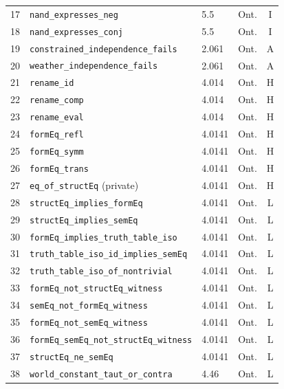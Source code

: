 \documentclass[10pt, letterpaper]{article}
\theoremstyle{definition}
\theoremstyle{remark}
\begin{document}
\begin{table}[p]
\begin{tabular}{@{}rlllc@{}}
17 & \texttt{nand\_expresses\_neg}                       & 5.5     & Ont. & I \\
18 & \texttt{nand\_expresses\_conj}                      & 5.5     & Ont. & I \\
19 & \texttt{constrained\_independence\_fails}           & 2.061   & Ont. & A \\
20 & \texttt{weather\_independence\_fails}               & 2.061   & Ont. & A \\
21 & \texttt{rename\_id}                                 & 4.014   & Ont. & H \\
22 & \texttt{rename\_comp}                               & 4.014   & Ont. & H \\
23 & \texttt{rename\_eval}                               & 4.014   & Ont. & H \\
24 & \texttt{formEq\_refl}                               & 4.0141  & Ont. & H \\
25 & \texttt{formEq\_symm}                               & 4.0141  & Ont. & H \\
26 & \texttt{formEq\_trans}                              & 4.0141  & Ont. & H \\
27 & \texttt{eq\_of\_structEq} (private)                 & 4.0141  & Ont. & H \\
28 & \texttt{structEq\_implies\_formEq}                  & 4.0141  & Ont. & L \\
29 & \texttt{structEq\_implies\_semEq}                   & 4.0141  & Ont. & L \\
30 & \texttt{formEq\_implies\_truth\_table\_iso}         & 4.0141  & Ont. & L \\
31 & \texttt{truth\_table\_iso\_id\_implies\_semEq}      & 4.0141  & Ont. & L \\
32 & \texttt{truth\_table\_iso\_of\_nontrivial}          & 4.0141  & Ont. & L \\
33 & \texttt{formEq\_not\_structEq\_witness}             & 4.0141  & Ont. & L \\
34 & \texttt{semEq\_not\_formEq\_witness}                & 4.0141  & Ont. & L \\
35 & \texttt{formEq\_not\_semEq\_witness}                & 4.0141  & Ont. & L \\
36 & \texttt{formEq\_semEq\_not\_structEq\_witness}      & 4.0141  & Ont. & L \\
37 & \texttt{structEq\_ne\_semEq}                        & 4.0141  & Ont. & L \\
38 & \texttt{world\_constant\_taut\_or\_contra}          & 4.46    & Ont. & L \\

\end{tabular}
\end{table}
\end{document}
